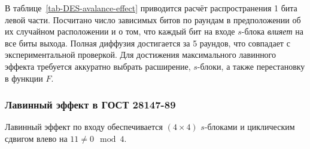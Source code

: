 В таблице~\ref{tab-DES-avalance-effect} приводится расчёт распространения 1 бита левой части. Посчитано число зависимых битов по раундам в предположении об их случайном расположении и о том, что каждый бит на входе $s$-блока \emph{влияет} на все биты выхода. Полная диффузия достигается за 5 раундов, что совпадает с экспериментальной проверкой. Для достижения максимального лавинного эффекта требуется аккуратно выбрать расширение, $s$-блоки, а также перестановку в функции $F$.


\subsubsection{Лавинный эффект в ГОСТ 28147-89}

Лавинный эффект по входу обеспечивается $(4 \times 4)$ $s$-блоками и циклическим сдвигом влево на $11 \neq 0 \mod 4$.

\begin{table}[!ht]
    \centering
    \caption{Распространение влияния 1 бита левой части в ГОСТ 28147-89\label{tab:GOST-avalance-effect}}
\end{table}

